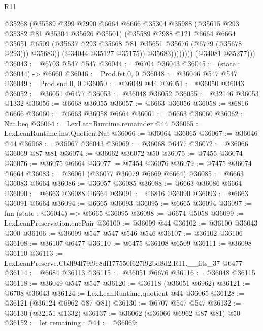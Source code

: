 \begin{lexlean}{R11}
\begin{coremodule}
                          @35268
                          (@35589
                            @399
                            @2990
                            @6664
                            @6666
                            @35304
                            @35988
                            (@35615 @293 @35382 @81 @35304 @35626 @35501)
                            (@35589
                              @2988
                              @121
                              @6664
                              @6664
                              @35651
                              @6509
                              (@35637 @293 @35668 @81 @35651 @35676 (@6779 (@35678 @293)))
                              @35683))
                          (@34044 @35127 @35175))
                        @35683))))))))
        (@34081 @35277)))
@36043 := @6703 @547 @547
@36044 := @6704 @36043
@36045 := (state : @36044) -> @6660
@36046 := Prod.fst.{0, 0}
@36048 := @36046 @547 @547
@36049 := Prod.snd.{0, 0}
@36050 := @36049 @44
@36051 := @36050 @36043
@36052 := @36051 @6477
@36053 := @36048 @36052
@36055 := @32146 @36053 @1332
@36056 := @6668 @36055
@36057 := @6663 @36056
@36058 := @6816 @6666
@36060 := @6663 @36058 @6664
@36061 := @6663 @36060
@36062 := Nat.beq
@36064 := LexLeanRuntime.remainder @44
@36065 := LexLeanRuntime.instQuotientNat
@36066 := @36064 @36065
@36067 := @36046 @44
@36068 := @36067 @36043
@36069 := @36068 @6477
@36072 := @36066 @36069 @87 @81
@36074 := @36062 @36072 @50
@36075 := @7455 @36074
@36076 := @36075 @6664
@36077 := @7454 @36076
@36079 := @7475 @36074 @6664
@36083 := @36061 (@36077 @36079 @6669 @6664)
@36085 := @6663 @36083 @6664
@36086 := @36057 @36085
@36088 := @6663 @36086 @6664
@36090 := @6663 @36088 @6664
@36091 := @6816 @36090
@36093 := @6663 @36091 @6664
@36094 := @6665 @36093
@36095 := @6665 @36094
@36097 := fun (state : @36044) => @6665 @36095
@36098 := @6674 @5058
@36099 := LexLeanPreservation.encPair
@36100 := @36099 @44
@36102 := @36100 @36043 @300
@36106 := @36099 @547 @547 @546 @546
@36107 := @36102 @36106
@36108 := @36107 @6477
@36110 := @6475 @36108 @6509
@36111 := @36098 @36110
@36113 := LexLeanPreserve.Cb3f94f79f9e8df177550f627f92bd8d2.R11.__fits_37 @6477
@36114 := @6684 @36113
@36115 := @36051 @6676
@36116 := @36048 @36115
@36118 := @36049 @547 @547
@36120 := @36118 (@36051 @6962)
@36121 := @6708 @36043
@36124 := LexLeanRuntime.quotient @44 @36065
@36128 := @36121 (@36124 @6962 @87 @81)
@36130 := @6707 @547 @547
@36132 := @36130 (@32151 @1332)
@36137 := @36062 (@36066 @6962 @87 @81) @50
@36152 := let remaining : @44 := @36069;

\end{coremodule}
\end{lexlean}
